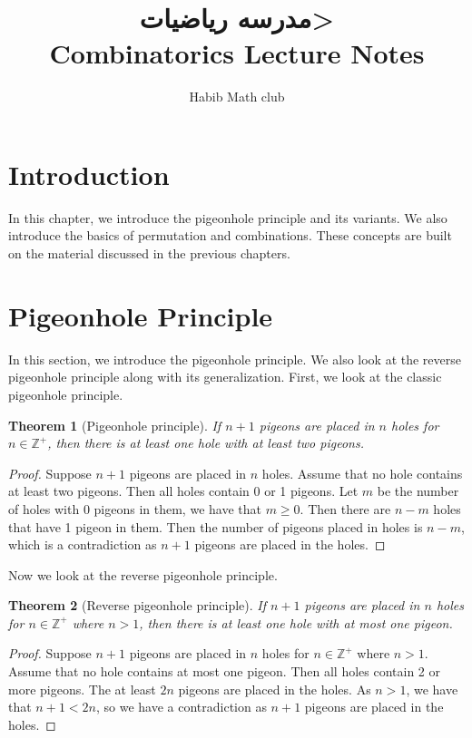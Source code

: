 \documentclass[12pt]{article}
\title{\Huge \<مدرسه رياضيات>\\
\vspace*{0.5cm}
\Large
Combinatorics Lecture Notes
}
\author{Habib Math club}
\newtheorem{theorem}{Theorem}
\begin{document}
\maketitle

\section{Introduction}
In this chapter, we introduce the pigeonhole principle and its variants. We also introduce the basics of permutation and combinations. These concepts are built on the material discussed in the previous chapters. 

\section{Pigeonhole Principle}\label{sec: pigeon}
In this section, we introduce the pigeonhole principle. 
We also look at the reverse pigeonhole principle along with its generalization. 
First, we look at the classic pigeonhole principle.

\begin{theorem}[Pigeonhole principle]\label{thrm: pigeonhole}
    If $n+1$ pigeons are placed in $n$ holes for $n \in \mathbb{Z}^+$, then there is at least one hole with at least two pigeons.
\end{theorem}
\begin{proof}
    Suppose $n+1$ pigeons are placed in $n$ holes.
    Assume that no hole contains at least two pigeons. Then all holes contain 0 or 1 pigeons.
    Let $m$ be the number of holes with 0 pigeons in them, we have that $m \geq 0$. Then there are $n-m$ holes that have 1 pigeon in them.
    Then the number of pigeons placed in holes is $n-m$, which is a contradiction as $n+1$ pigeons are placed in the holes.
\end{proof}

Now we look at the reverse pigeonhole principle.

\begin{theorem}[Reverse pigeonhole principle]\label{thrm: reverse pigeonhole}
    If $n+1$ pigeons are placed in $n$ holes for $n \in \mathbb{Z}^+$ where $n > 1$, then there is at least one hole with at most one pigeon.
\end{theorem}
\begin{proof}
    Suppose $n+1$ pigeons are placed in $n$ holes for $n \in \mathbb{Z}^+$ where $n > 1$.
    Assume that no hole contains at most one pigeon. Then all holes contain 2 or more pigeons.
    The at least $2n$ pigeons are placed in the holes. 
    As $n > 1$, we have that $n+1 < 2n$, so we have a contradiction as $n+1$ pigeons are placed in the holes.
\end{proof}
\end{document}
